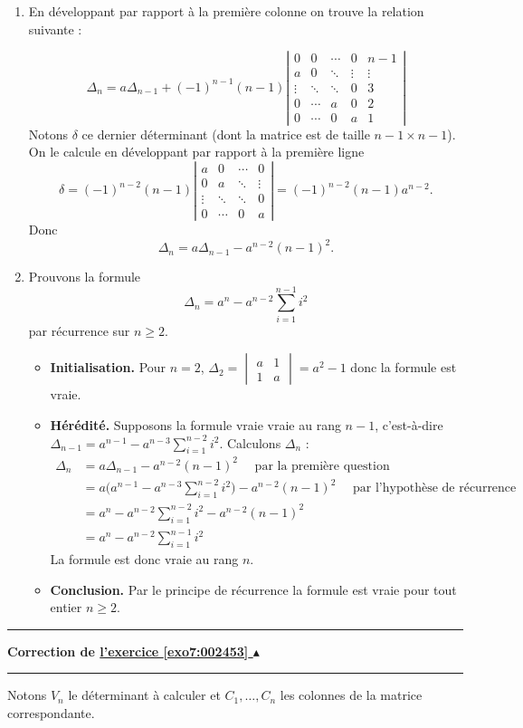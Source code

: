 \documentclass[11pt,a4paper]{article}
\renewcommand{\ge}{\geqslant} \renewcommand{\geq}{\geqslant}
\newcounter{exo}
\newcommand{\correction}[1]{\hypertarget{cor7:#1}{}\label{cor7:#1}{\bf Correction de \hyperlink{exo7:#1}{l'exercice \ref{exo7:#1} $\blacktriangle$}}\vspace{1mm}\hrule\vspace{1mm}}
\newcommand{\fincorrection}{\vspace{1mm}\hrule\vspace*{7mm}}
\begin{document}
\begin{enumerate}
  \item En développant par rapport à la première colonne on trouve la relation suivante :

$$\Delta_n = a \Delta_{n-1} + (-1)^{n-1}(n-1) 
\left\vert
\begin{matrix}
       0   &    0   & \cdots & 0      & n-1 \\
       a   &    0   & \ddots & \vdots & \vdots \\
    \vdots & \ddots & \ddots & 0      & 3 \\
       0   & \cdots &   a    & 0      & 2 \\
       0  & \cdots &   0    & a      & 1
\end{matrix}
\right\vert
$$
Notons $\delta$ ce dernier déterminant (dont la matrice est de taille $n-1\times n-1$). 
On le calcule en développant par rapport à la première ligne 
$$\delta  = (-1)^{n-2}(n-1)
\left\vert
\begin{matrix}
       a   &    0   & \cdots      & 0 \\
       0   &    a   & \ddots      & \vdots \\
    \vdots & \ddots & \ddots      & 0  \\
       0   & \cdots &   0         & a
\end{matrix}\right\vert
= (-1)^{n-2}(n-1) a^{n-2}.
$$
Donc 
$$\Delta_n = a \Delta_{n-1} - a^{n-2}(n-1)^2.$$

  \item Prouvons la formule 
$$\Delta_n=a^n-a^{n-2}\sum_{i=1}^{n-1}{i^2}$$
par récurrence sur $n\ge 2$.

\begin{itemize}
  \item \textbf{Initialisation.} Pour $n=2$,
$\Delta_2=\begin{vmatrix}a&1\\1&a\end{vmatrix}=a^2-1$
donc la formule est vraie.

  \item \textbf{Hérédité.} Supposons la formule vraie vraie au rang $n-1$,
c'est-à-dire $\Delta_{n-1}=a^{n-1}-a^{n-3}\sum_{i=1}^{n-2}{i^2}$.
Calculons $\Delta_n$ :
\begin{align*}
\Delta_n 
  & = a \Delta_{n-1} - a^{n-2}(n-1)^2  \quad \text{ par la première question } \\
  & = a\Big(a^{n-1}-a^{n-3}\sum_{i=1}^{n-2}{i^2} \Big) - a^{n-2}(n-1)^2 \quad \text{ par l'hypothèse de récurrence} \\
  & = a^n -  a^{n-2}\sum_{i=1}^{n-2}{i^2} - a^{n-2}(n-1)^2 \\
  & = a^n-a^{n-2}\sum_{i=1}^{n-1}{i^2}
\end{align*}
La formule est donc vraie au rang $n$.

  \item \textbf{Conclusion.} Par le principe de récurrence la formule est vraie
pour tout entier $n\ge 2$.
\end{itemize}

\end{enumerate}
\fincorrection
\correction{002453}
Notons $V_n$ le déterminant à calculer
et $C_1,\ldots,C_n$ les colonnes de la matrice correspondante.
\end{document}
